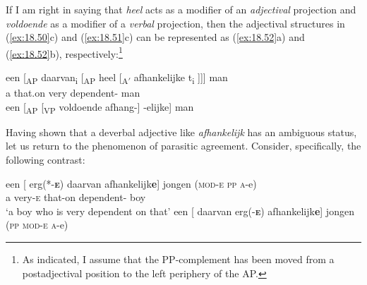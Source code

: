 \documentclass[output=paper]{langsci/langscibook}
\begin{document}
\ea%
    \label{ex:18.51}
	\z
\z

If I am right in saying that \emph{heel} acts as a modifier of an
\emph{adjectival} projection and \emph{voldoende} as a modifier of a
\emph{verbal} projection, then the adjectival structures in (\ref{ex:18.50}c)
and (\ref{ex:18.51}c) can be represented as (\ref{ex:18.52}a) and
(\ref{ex:18.52}b), respectively:\footnote{As indicated, I assume that the
PP-complement has been moved from a postadjectival position to the left
periphery of the AP.}

\ea%
    \label{ex:18.52}
	\ea
	\gll een [\textsubscript{AP} daarvan\textsubscript{i} [\textsubscript{AP}
    heel [\textsubscript{A$'$} afhankelijke t\textsubscript{i} ]]] man\\
    a {} that.on {} very {} dependent-\Agr{} {} {} man\\
	\ex een [\textsubscript{AP} [\textsubscript{VP}  voldoende  afhang-] -elijke] man
	\z
\z

Having shown that a deverbal adjective like \emph{afhankelijk} has an ambiguous
status, let us return to the phenomenon of parasitic agreement. Consider,
specifically, the following contrast:

\ea%
    \label{ex:18.53}
	\ea
	\gll een [ erg(*-\textbf{\textsc{e}})    daarvan    afhankelijk\textbf{e}]      jongen        (\textsc{mod}-\textsc{e} \textsc{pp} \textsc{a}-e)\\
    a   {}     very-\textsc{e}        that-on    dependent-\Agr{}    boy\\
	\glt \enquote*{a boy who is very dependent on that}
	\ex een [ daarvan erg(-\textbf{\textsc{e}}) afhankelijk\textbf{e}] jongen                  (\textsc{pp mod}-\textsc{e} \textsc{a}-e)
	\z
\z
\end{document}

